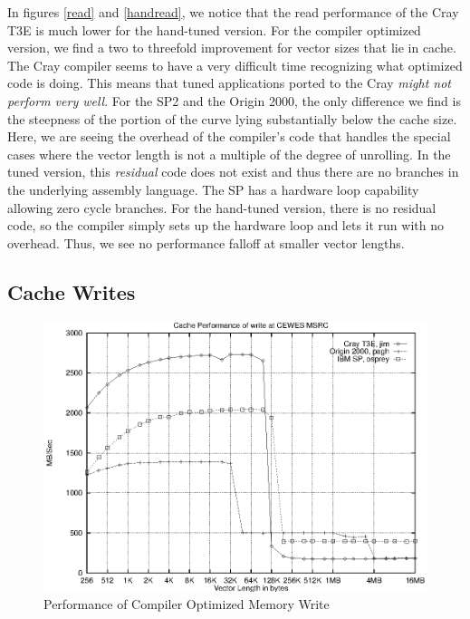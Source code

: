 \documentclass [12pt]{article}
\begin{document}
In figures \ref{read} and \ref{handread}, we notice that the read
performance of the Cray T3E is much lower for the hand-tuned
version. For the compiler optimized version, we find a two to 
threefold improvement for vector sizes that lie in cache. The Cray compiler
seems to have a very difficult time recognizing what optimized code is doing.
This means that tuned applications ported to the Cray {\em might not perform
very well}. For the SP2 and the Origin 2000,
the only difference we find is the steepness of the portion of the
curve lying substantially below the cache size.  Here, we are seeing
the overhead of the compiler's code that handles the special cases
where the vector length is not a multiple of the degree of
unrolling. In the tuned version, this {\em residual} code does not
exist and thus there are no branches in the underlying assembly
language. The SP has a hardware loop capability allowing zero cycle
branches. For the hand-tuned version, there is no residual code, so the
compiler simply sets up the hardware loop and lets it run with no overhead.
Thus, we see no performance falloff at smaller vector lengths. 

\clearpage
\newpage

\subsection{Cache Writes}
\begin{figure}[Hht]
\centerline{\includegraphics{pics/cache_cewes_write.ps}}
\caption{Performance of Compiler Optimized Memory Write}\label{write}
\end{figure}
\end{document}
